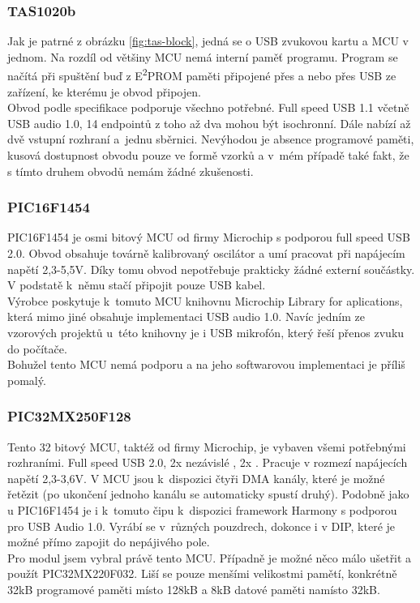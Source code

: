 \subsubsection{TAS1020b}	

Jak je patrné z obrázku \ref{fig:tas-block}, jedná se o USB \iis zvukovou kartu a MCU v jednom. Na rozdíl od většiny MCU nemá interní paměť programu. Program se načítá při spuštění buď z E\textsuperscript{2}PROM  paměti připojené přes \iic a nebo přes USB ze zařízení, ke kterému je obvod připojen.\\
Obvod podle specifikace \cite{tas} podporuje všechno potřebné. Full speed USB 1.1 včetně USB audio 1.0, 14 endpointů z toho až dva mohou být isochronní. Dále nabízí až dvě vstupní \iis rozhraní a~jednu \iic sběrnici. Nevýhodou je absence programové paměti, kusová dostupnost obvodu pouze ve formě vzorků a v~mém případě také fakt, že s tímto druhem obvodů nemám žádné zkušenosti.

\subsubsection{PIC16F1454}
PIC16F1454 je osmi bitový MCU od firmy Microchip s podporou full speed USB 2.0. Obvod obsahuje továrně kalibrovaný oscilátor a umí pracovat při napájecím napětí 2,3-5,5V. Díky tomu obvod nepotřebuje prakticky žádné externí součástky. V podstatě k~němu stačí připojit pouze USB kabel.\\
Výrobce poskytuje k~tomuto MCU knihovnu Microchip Library for aplications, která mimo jiné obsahuje implementaci USB audio 1.0. Navíc jedním ze vzorových projektů u~této knihovny je i USB mikrofón, který řeší přenos zvuku do počítače.\\
Bohužel tento MCU nemá podporu \iis a na jeho softwarovou implementaci je příliš pomalý. 

\subsubsection{PIC32MX250F128}
Tento 32 bitový MCU, taktéž od firmy Microchip, je vybaven všemi potřebnými rozhraními. Full speed USB 2.0, 2x nezávislé \iis, 2x \iic. Pracuje v rozmezí napájecích napětí 2,3-3,6V. V MCU jsou k~dispozici čtyři DMA kanály, které je možné řetězit (po ukončení jednoho kanálu se automaticky spustí druhý). Podobně jako u PIC16F1454 je i k~tomuto čipu k~dispozici framework Harmony \cite{harmony} s podporou pro USB Audio 1.0. Vyrábí se v~různých pouzdrech, dokonce i v DIP, které je možné přímo zapojit do nepájivého pole.\\
Pro modul jsem vybral právě tento MCU. Případně je možné něco málo ušetřit a použít PIC32MX220F032. Liší se pouze menšími velikostmi pamětí, konkrétně 32kB programové paměti místo 128kB a 8kB datové paměti namísto 32kB.

